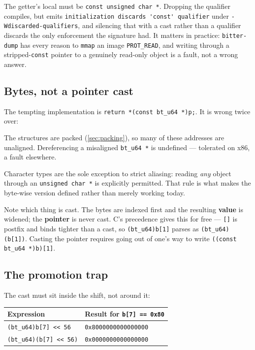 The getter's local must be \lstinline|const unsigned char *|. Dropping the
qualifier compiles, but emits
\lstinline|initialization discards 'const' qualifier| under
\lstinline|-Wdiscarded-qualifiers|, and silencing that with a cast rather than
a qualifier discards the only enforcement the signature had. It matters in
practice: \lstinline|bitter-dump| has every reason to \lstinline|mmap| an image
\lstinline|PROT_READ|, and writing through a stripped-\lstinline|const| pointer
to a genuinely read-only object is a fault, not a wrong answer.

\subsection{Bytes, not a pointer cast}

The tempting implementation is \lstinline|return *(const bt_u64 *)p;|. It is
wrong twice over:

\begin{description}[leftmargin=2.2cm,style=nextline]
  \item[Alignment] The structures are packed (\cref{sec:packing}), so many of
    these addresses are unaligned. Dereferencing a misaligned
    \lstinline|bt_u64 *| is undefined --- tolerated on x86, a fault elsewhere.
  \item[Aliasing] Character types are the sole exception to strict aliasing:
    reading \emph{any} object through an \lstinline|unsigned char *| is
    explicitly permitted. That rule is what makes the byte-wise version defined
    rather than merely working today.
\end{description}

Note which thing is cast. The bytes are indexed first and the resulting
\textbf{value} is widened; the \textbf{pointer} is never cast. C's precedence
gives this for free --- \lstinline|[]| is postfix and binds tighter than a
cast, so \lstinline|(bt_u64)b[1]| parses as \lstinline|(bt_u64)(b[1])|.
Casting the pointer requires going out of one's way to write
\lstinline|((const bt_u64 *)b)[1]|.

\subsection{The promotion trap}

The cast must sit inside the shift, not around it:

\begin{center}
\begin{tabular}{ll}
  \toprule
  Expression & Result for \lstinline|b[7] == 0x80| \\
  \midrule
  \lstinline|(bt_u64)b[7] << 56|   & \lstinline|0x8000000000000000| \\
  \lstinline|(bt_u64)(b[7] << 56)| & \lstinline|0x0000000000000000| \\
  \bottomrule
\end{tabular}
\end{center}

